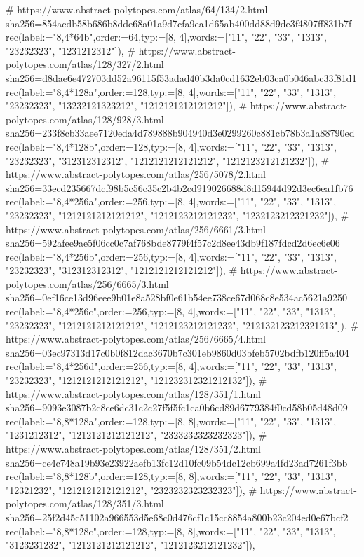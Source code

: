 \documentclass[11pt,a4paper]{article}
\begin{document}
\begin{CompleteProgram}
# https://www.abstract-polytopes.com/atlas/64/134/2.html sha256=854acdb58b686b8dde68a01a9d7cfa9ea1d65ab400dd88d9de3f4807ff831b7f
rec(label:="{8,4}*64b",order:=64,typ:=[8, 4],words:=["11", "22", "33", "1313", "23232323", "1231212312"]),
# https://www.abstract-polytopes.com/atlas/128/327/2.html sha256=d8dae6e472703dd52a96115f53adad40b3da0cd1632eb03ca0b046abc33f81d1
rec(label:="{8,4}*128a",order:=128,typ:=[8, 4],words:=["11", "22", "33", "1313", "23232323", "13232121323212", "1212121212121212"]),
# https://www.abstract-polytopes.com/atlas/128/928/3.html sha256=233f8cb33aee7120eda4d789888b904940d3e0299260c881cb78b3a1a88790ed
rec(label:="{8,4}*128b",order:=128,typ:=[8, 4],words:=["11", "22", "33", "1313", "23232323", "312312312312", "1212121212121212", "1212123212121232"]),
# https://www.abstract-polytopes.com/atlas/256/5078/2.html sha256=33ecd235667dcf98b5c56c35c2b4b2cd919026688d8d15944d92d3ec6ea1fb76
rec(label:="{8,4}*256a",order:=256,typ:=[8, 4],words:=["11", "22", "33", "1313", "23232323", "1212121212121212", "1212123212121232", "1232123212321232"]),
# https://www.abstract-polytopes.com/atlas/256/6661/3.html sha256=592afee9ae5f06cc0c7af768bde8779f4f57c2d8ee43db9f187fdcd2d6ec6e06
rec(label:="{8,4}*256b",order:=256,typ:=[8, 4],words:=["11", "22", "33", "1313", "23232323", "312312312312", "1212121212121212"]),
# https://www.abstract-polytopes.com/atlas/256/6665/3.html sha256=0ef16ce13d96eee9b01e8a528bf0e61b54ee738ce67d068c8e534ac5621a9250
rec(label:="{8,4}*256c",order:=256,typ:=[8, 4],words:=["11", "22", "33", "1313", "23232323", "1212121212121212", "1212123212121232", "212132123212321213"]),
# https://www.abstract-polytopes.com/atlas/256/6665/4.html sha256=03ec97313d17c0b0f812dac3670b7c301eb9860d03bfeb5702bdfb120ff5a404
rec(label:="{8,4}*256d",order:=256,typ:=[8, 4],words:=["11", "22", "33", "1313", "23232323", "1212121212121212", "121232312321212132"]),
# https://www.abstract-polytopes.com/atlas/128/351/1.html sha256=9093e3087b2c8ce6dc31c2c27f5f5fc1ca0b6cd89d6779384f0cd58b05d48d09
rec(label:="{8,8}*128a",order:=128,typ:=[8, 8],words:=["11", "22", "33", "1313", "1231212312", "1212121212121212", "2323232323232323"]),
# https://www.abstract-polytopes.com/atlas/128/351/2.html sha256=ce4c748a19b93e23922aefb13fc12d10fc09b54dc12cb699a4fd23ad7261f3bb
rec(label:="{8,8}*128b",order:=128,typ:=[8, 8],words:=["11", "22", "33", "1313", "12321232", "1212121212121212", "2323232323232323"]),
# https://www.abstract-polytopes.com/atlas/128/351/3.html sha256=25f2d45c51102a966553d5e68c0d476cf1c15cc8854a800b23c204ed0e67bcf2
rec(label:="{8,8}*128c",order:=128,typ:=[8, 8],words:=["11", "22", "33", "1313", "3123231232", "1212121212121212", "1212123212121232"]),

\end{CompleteProgram}
\end{document}
